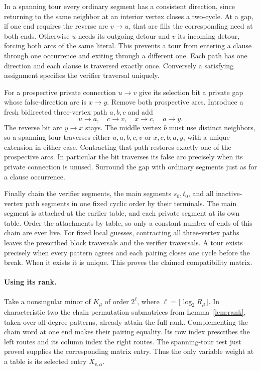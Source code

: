 \documentclass[11pt]{article}
\theoremstyle{definition}
\begin{document}
In a spanning tour every ordinary segment has a consistent direction, since returning to the same neighbor at an interior vertex closes a two-cycle. At a gap, if one end requires the reverse arc \(v\to u\), that arc fills the corresponding need at both ends. Otherwise \(u\) needs its outgoing detour and \(v\) its incoming detour, forcing both arcs of the same literal. This prevents a tour from entering a clause through one occurrence and exiting through a different one. Each path has one direction and each clause is traversed exactly once. Conversely a satisfying assignment specifies the verifier traversal uniquely.

For a prospective private connection \(u\to v\) give its selection bit a private gap whose false-direction arc is \(x\to y\). Remove both prospective arcs. Introduce a fresh bidirected three-vertex path \(a,b,c\) and add
\[
                         u\to a,\quad c\to v,\quad x\to c,\quad a\to y .
\]
The reverse bit arc \(y\to x\) stays. The middle vertex \(b\) must use distinct neighbors, so a spanning tour traverses either \(u,a,b,c,v\) or \(x,c,b,a,y\), with a unique extension in either case. Contracting that path restores exactly one of the prospective arcs. In particular the bit traverses its false arc precisely when its private connection is unused. Surround the gap with ordinary segments just as for a clause occurrence.

Finally chain the verifier segments, the main segments \(s_0,t_0\), and all inactive-vertex path segments in one fixed cyclic order by their terminals. The main segment is attached at the earlier table, and each private segment at its own table. Order the attachments by table, so only a constant number of ends of this chain are ever live. For fixed local guesses, contracting all three-vertex paths leaves the prescribed block traversals and the verifier traversals. A tour exists precisely when every pattern agrees and each pairing closes one cycle before the break. When it exists it is unique. This proves the claimed compatibility matrix.

\paragraph{Using its rank.}
Take a nonsingular minor of \(K_\mu\) of order \(2^\ell\), where \(\ell=\lfloor\log_2 R_\mu\rfloor\). In characteristic two the chain permutation submatrices from Lemma~\ref{lem:rank}, taken over all degree patterns, already attain the full rank. Complementing the chain word at one end makes their pairing equality. Its row index prescribes the left routes and its column index the right routes. The spanning-tour test just proved supplies the corresponding matrix entry. Thus the only variable weight at a table is its selected entry \(X_{v,\alpha}\).
\end{document}
